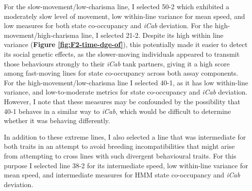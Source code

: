 \documentclass[
]{article}
\begin{document}
For the slow-movement/low-charisma line, I selected \textcolor{50-2_BB81FF}{50-2} which exhibited a moderately slow level of movement, low within-line variance for mean speed, and low measures for both state co-occupancy and \emph{\textcolor{iCab_424B4D}{iCab}} deviation. For the high-movement/high-charisma line, I selected \textcolor{21-2_49B500}{21-2}. Despite its high within line variance (\textbf{Figure \ref{fig:F2-time-dge-of}}), this potentially made it easier to detect its social genetic effects, as the slower-moving individuals appeared to transmit those behaviours strongly to their \emph{\textcolor{iCab_424B4D}{iCab}} tank partners, giving it a high score among fast-moving lines for state co-occupancy across both assay components. For the high-movement/low-charisma line I selected \textcolor{40-1_93AA00}{40-1}, as it has low within-line variance, and low-to-moderate metrics for state co-occupancy and \emph{\textcolor{iCab_424B4D}{iCab}} deviation. However, I note that these measures may be confounded by the possibility that \textcolor{40-1_93AA00}{40-1} behaves in a similar way to \emph{\textcolor{iCab_424B4D}{iCab}}, which would be difficult to determine whether it was behaving differently.

In addition to these extreme lines, I also selected a line that was intermediate for both traits in an attempt to avoid breeding incompatibilities that might arise from attempting to cross lines with such divergent behavioural traits. For this purpose I selected line \textcolor{38-2_00C08B}{38-2} for its intermediate speed, low within-line variance for mean speed, and intermediate measures for HMM state co-occupancy and \emph{\textcolor{iCab_424B4D}{iCab}} deviation.
\end{document}
